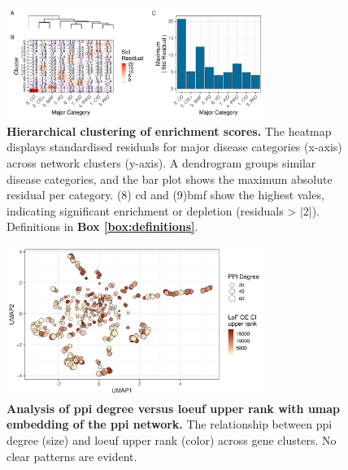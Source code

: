 \begin{figure}[h]
  \centering
  \includegraphics[width=0.75\textwidth]{../images/untangleR_ppi_network_patch2_cator.pdf}
  \caption{
   \textbf{Hierarchical clustering of enrichment scores.}
    The heatmap displays standardised residuals for major disease categories (x-axis) across network clusters (y-axis). A dendrogram groups similar disease categories, and the bar plot shows the maximum absolute residual per category.  (8) \ac{cd} and (9)\ac{bmf} show the highest vales, indicating significant enrichment or depletion (residuals > |2|). Definitions in \textbf{Box \ref{box:definitions}}.
  }
  \label{fig:patch2}
\end{figure}


\begin{figure}[h]
  \centering
  \includegraphics[width=0.75\textwidth]{../images/untangleR_ppi_network_p_umap_const.pdf}
  \caption{
   \textbf{Analysis of \ac{ppi} degree versus \ac{loeuf} upper rank with \ac{umap} embedding of the \ac{ppi} network.}
    The relationship between \ac{ppi} degree (size) and \ac{loeuf} upper rank (color) across gene clusters. No clear patterns are evident.
  }
  \label{fig:p_umap_const}
\end{figure}

